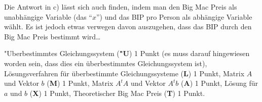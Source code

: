 \begin{diskussion}
Die Antwort in c) lässt sich auch finden, indem man den Big Mac Preis
als unabhängige Variable (das ``$x$'') und das BIP pro Person als
abhängige Variable wählt. 
Es ist jedoch etwas verwegen davon auszugehen, dass das BIP durch den
Big Mac Preis bestimmt wird\dots
\end{diskussion}

\begin{bewertung}
"Uberbestimmtes Gleichungssystem ({\bf "U}) 1 Punkt (es muss darauf hingewiesen
worden sein, dass dies ein überbestimmtes Gleichungssystem ist),
Lösungsverfahren für überbestimmte Gleichungssysteme ({\bf L}) 1 Punkt,
Matrix $A$ und Vektor $b$ ({\bf M}) 1 Punkt,
Matrix $A^tA$ und Vektor $A^tb$ ({\bf A}) 1 Punkt,
Lösung für $a$ und $b$ ({\bf X}) 1 Punkt,
Theoretischer Big Mac Preis ({\bf T}) 1 Punkt.
\end{bewertung}

